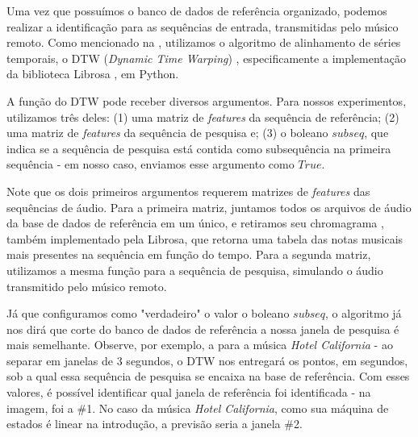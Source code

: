 Uma vez que possuímos o banco de dados de referência organizado, podemos realizar a identificação para as sequências de entrada, transmitidas pelo músico remoto. Como mencionado na , utilizamos o algoritmo de alinhamento de séries temporais, o DTW (\textit{Dynamic Time Warping}) \cite{dtw}, especificamente a implementação da biblioteca Librosa \cite{librosa}, em Python.

A função do DTW pode receber diversos argumentos. Para nossos experimentos, utilizamos três deles: (1) uma matriz de \textit{features} da sequência de referência; (2) uma matriz de \textit{features} da sequência de pesquisa e; (3) o boleano $subseq$, que indica se a sequência de pesquisa está contida como subsequência na primeira sequência - em nosso caso, enviamos esse argumento como $True$.

Note que os dois primeiros argumentos requerem matrizes de \textit{features} das sequências de áudio. Para a primeira matriz, juntamos todos os arquivos de áudio da base de dados de referência em um único, e retiramos seu chromagrama \cite{chromagram}, também implementado pela Librosa, que retorna uma tabela das notas musicais mais presentes na sequência em função do tempo. Para a segunda matriz, utilizamos a mesma função para a sequência de pesquisa, simulando o áudio transmitido pelo músico remoto.

Já que configuramos como "verdadeiro" o valor o boleano $subseq$, o algoritmo já nos dirá que corte do banco de dados de referência a nossa janela de pesquisa é mais semelhante. Observe, por exemplo, a  para a música \textit{Hotel California} - ao separar em janelas de 3 segundos, o DTW nos entregará os pontos, em segundos, sob a qual essa sequência de pesquisa se encaixa na base de referência. Com esses valores, é possível identificar qual janela de referência foi identificada - na imagem, foi a \#1. No caso da música \textit{Hotel California}, como sua máquina de estados é linear na introdução, a previsão seria a janela \#2.

